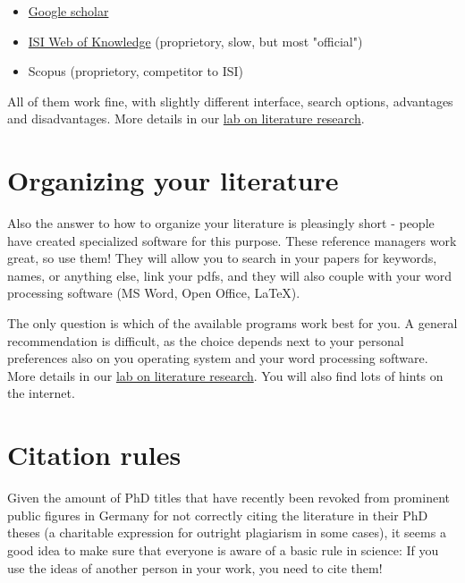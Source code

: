 \documentclass{tufte-book}
\begin{document}
\begin{itemize}
\item \href{https://scholar.google.de/}{Google scholar} 
\item \href{http://webofknowledge.com/}{ISI Web of Knowledge} (proprietory, slow, but most "official")
\item Scopus (proprietory, competitor to ISI)
\end{itemize}

All  of them work fine, with slightly different interface, search options, advantages and disadvantages. More details in our \href{https://github.com/florianhartig/ResearchSkills/tree/master/Labs/LiteratureResearch}{lab on literature research}. 

\section{Organizing your literature}

Also the answer to how to organize your literature is pleasingly short - people have created specialized software for this purpose. These reference managers work great, so use them! They will allow you to search in your papers for keywords, names, or anything else, link your pdfs, and they will also couple with your word processing software (MS Word, Open Office, LaTeX). 


The only question is which of the available programs work best for you. A general recommendation is difficult, as the choice depends next to your personal preferences also on you operating system and your word processing software. More details in our \href{https://github.com/florianhartig/ResearchSkills/tree/master/Labs/LiteratureResearch}{lab on literature research}. You will also find lots of hints on the internet. 

\section{Citation rules}

Given the amount of PhD titles that have recently been revoked from prominent public figures in Germany for not correctly citing the literature in their PhD theses (a charitable expression for outright plagiarism in some cases), it seems a good idea to make sure that everyone is aware of a basic rule in science: If you use the ideas of another person in your work, you need to cite them!
\end{document}
